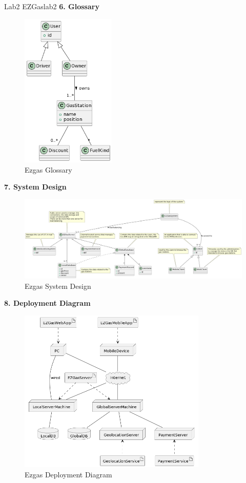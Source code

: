 \documentclass[12pt]{article}
\begin{document}
\begin{example}{Lab2 EZGas}{lab2}
  \textbf{6. Glossary}
  \begin{figure}[H]
    \centering
    \includegraphics[width=0.4\textwidth]{ezgas-glossary.png}
    \caption{Ezgas Glossary}
    \label{fig:ezgas-glossary}
  \end{figure}
  \textbf{7. System Design}
  \begin{figure}[H]
    \centering
    \includegraphics[width=1\textwidth]{ezgas-system-design.png}
    \caption{Ezgas System Design}
    \label{fig:ezgas-system-design}
  \end{figure}
  \textbf{8. Deployment Diagram}
  \begin{figure}[H]
    \centering
    \includegraphics[width=0.8\textwidth]{ezgas-deployment-diagram.png}
    \caption{Ezgas Deployment Diagram}
    \label{fig:ezgas-deployment-diagram}
  \end{figure}
\end{example}
\end{document}
